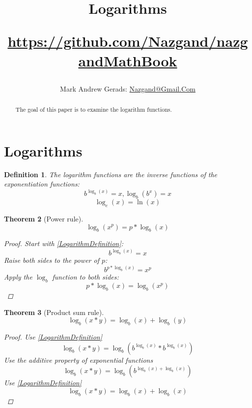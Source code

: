 \documentclass[]{article}
\author{Mark Andrew Gerads: \href{MailTo:Nazgand@Gmail.Com}{Nazgand@Gmail.Com}}
\title{
	Logarithms
	
	\href{https://github.com/Nazgand/nazgandMathBook}{https://github.com/Nazgand/nazgandMathBook}
}
\newcommand{\pqty}[1]{{\left(#1\right)}}
\newtheorem{theorem}{Theorem}[section]
\newtheorem{definition}[theorem]{Definition}
\numberwithin{equation}{section}
\begin{document}
	
	\maketitle
	
	\begin{abstract}
		The goal of this paper is to examine the logarithm functions.
	\end{abstract}
	
	\section{Logarithms}
	\begin{definition}
		The logarithm functions are the inverse functions of the exponentiation functions:
		\begin{equation}
			\label{LogarithmDefinition}
			b^{\log_b\pqty{x}}=x
			,
			\log_b\pqty{b^x}=x
		\end{equation}
		\begin{equation}
		\log_e\pqty{x}=\ln\pqty{x}
		\end{equation}
	\end{definition}

	\begin{theorem}[Power rule]
		\begin{equation}
		\log_b\pqty{x^p}=p*\log_b\pqty{x}
		\end{equation}
		\begin{proof}
			Start with \eqref{LogarithmDefinition}:
			\begin{equation}
			b^{\log_b\pqty{x}}=x
			\end{equation}
			Raise both sides to the power of \(p\):
			\begin{equation}
			b^{p*\log_b\pqty{x}}=x^p
			\end{equation}
			Apply the \(\log_b\) function to both sides:
			\begin{equation}
			p*\log_b\pqty{x}=\log_b\pqty{x^p}
			\end{equation}
		\end{proof}
	\end{theorem}

	\begin{theorem}[Product sum rule]
		\begin{equation}
		\log_b\pqty{x*y}=\log_b\pqty{x}+\log_b\pqty{y}
		\end{equation}
		\begin{proof}
			Use \eqref{LogarithmDefinition}
			\begin{equation}
			\log_b\pqty{x*y}=
			\log_b\pqty{b^{\log_b\pqty{x}}*b^{\log_b\pqty{x}}}
			\end{equation}
			Use the additive property of exponential functions
			\begin{equation}
			\log_b\pqty{x*y}=
			\log_b\pqty{b^{\log_b\pqty{x}+\log_b\pqty{x}}}
			\end{equation}
			Use \eqref{LogarithmDefinition}
			\begin{equation}
			\log_b\pqty{x*y}=
			\log_b\pqty{x}+\log_b\pqty{x}
			\end{equation}
		\end{proof}
	\end{theorem}
\end{document}
